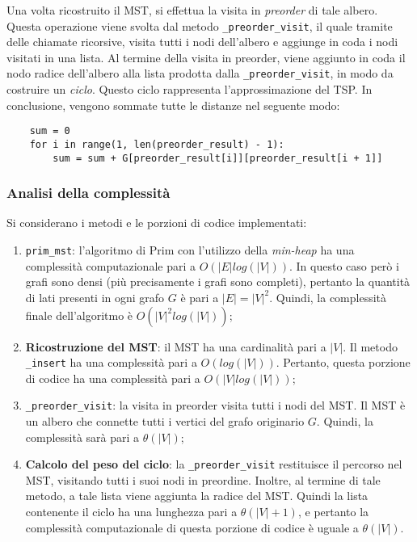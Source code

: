 Una volta ricostruito il MST, si effettua la visita in \textit{preorder} di tale albero. 
Questa operazione viene svolta dal metodo \verb|_preorder_visit|, il quale tramite 
delle chiamate ricorsive, visita tutti i nodi dell'albero e aggiunge in coda i nodi 
visitati in una lista. Al termine della visita in preorder, viene aggiunto in coda 
il nodo radice dell'albero alla lista prodotta dalla \verb|_preorder_visit|, in modo da 
costruire un \textit{ciclo}. Questo ciclo rappresenta l'approssimazione del TSP. 
In conclusione, vengono sommate tutte le distanze nel seguente modo:
\begin{verbatim}
    sum = 0
    for i in range(1, len(preorder_result) - 1):
        sum = sum + G[preorder_result[i]][preorder_result[i + 1]]
\end{verbatim}

\subsubsection{Analisi della complessità}

Si considerano i metodi e le porzioni di codice implementati:
\begin{enumerate}
    \item \verb|prim_mst|: l'algoritmo di Prim con l'utilizzo della \textit{min-heap} ha 
    una complessità computazionale pari a $O(|E|log(|V|))$. In questo caso però i grafi 
    sono densi (più precisamente i grafi sono completi), pertanto la quantità di lati 
    presenti in ogni grafo $G$ è pari a $|E| = |V|^2$. Quindi, la complessità finale 
    dell'algoritmo è $O(|V|^2 log(|V|))$;
    \item \textbf{Ricostruzione del MST}: il MST ha una cardinalità pari a $|V|$. Il metodo 
    \verb|_insert| ha una complessità pari a $O(log(|V|))$. Pertanto, questa porzione di 
    codice ha una complessità pari a $O(|V| log(|V|))$;
    \item \verb|_preorder_visit|: la visita in preorder visita tutti i nodi del MST. Il MST 
    è un albero che connette tutti i vertici del grafo originario $G$. Quindi, la 
    complessità sarà pari a $\theta(|V|)$;
    \item \textbf{Calcolo del peso del ciclo}: la \verb|_preorder_visit| restituisce il 
    percorso nel MST, visitando tutti i suoi nodi in preordine. Inoltre, al termine di 
    tale metodo, a tale lista viene aggiunta la radice del MST. Quindi la lista contenente 
    il ciclo ha una lunghezza pari a $\theta(|V| + 1)$, e pertanto la complessità computazionale 
    di questa porzione di codice è uguale a $\theta(|V|)$.
\end{enumerate}

